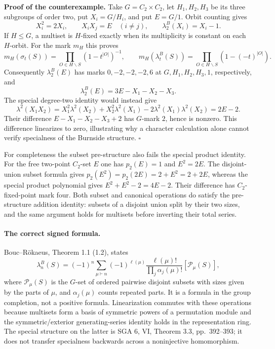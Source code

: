 \documentclass[11pt]{article}
\begin{document}
\textbf{Proof of the counterexample.}
Take $G=C_2\times C_2$, let $H_1,H_2,H_3$ be its three subgroups of order
two, put $X_i=G/H_i$, and put $E=G/1$.  Orbit counting gives
\[
 X_i^2=2X_i,\qquad X_iX_j=E\quad(i\ne j),\qquad
 \lambda_2^B(X_i)=X_i-1.
\]
If $H\leq G$, a multiset is $H$-fixed exactly when its multiplicity is
constant on each $H$-orbit.  For the mark $m_H$ this proves
\[
 m_H(\sigma_t(S))=\prod_{O\in H\backslash S}(1-t^{|O|})^{-1},\qquad
 m_H(\lambda_t^B(S))=\prod_{O\in H\backslash S}(1-(-t)^{|O|}).
\]
Consequently $\lambda_2^B(E)$ has marks $0,-2,-2,-2,6$ at
$G,H_1,H_2,H_3,1$, respectively, and
\[
 \lambda_2^B(E)=3E-X_1-X_2-X_3.
\]
The special degree-two identity would instead give
\[
 \lambda^2(X_1X_2)
 =X_1^2\lambda^2(X_2)+X_2^2\lambda^2(X_1)
       -2\lambda^2(X_1)\lambda^2(X_2)=2E-2.
\]
Their difference $E-X_1-X_2-X_3+2$ has $G$-mark $2$, hence is nonzero.
This difference linearizes to zero, illustrating why a character calculation
alone cannot verify specialness of the Burnside structure. \hfill$\square$

For completeness the subset pre-structure also fails the special
product identity. For the free two-point $C_2$-set $E$ one has
$p_2(E)=1$ and $E^2=2E$. The disjoint-union subset formula gives
$p_2(E^2)=p_2(2E)=2+E^2=2+2E$, whereas the special product
polynomial gives $E^2+E^2-2=4E-2$. Their difference has
$C_2$-fixed-point mark four. Both subset and canonical operations
do satisfy the pre-structure addition identity: subsets of a
disjoint union split by their two sizes, and the same argument
holds for multisets before inverting their total series.

\paragraph{The correct signed formula.}
Bouc--R\"okaeus, Theorem 1.1 (1.2), states
\[
 \lambda_n^B(S)=(-1)^n\sum_{\mu\vdash n}(-1)^{\ell(\mu)}
 \frac{\ell(\mu)!}{\prod_j\alpha_j(\mu)!}[\mathcal P_\mu(S)],
\]
where $\mathcal P_\mu(S)$ is the $G$-set of ordered pairwise disjoint subsets
with sizes given by the parts of $\mu$, and $\alpha_j(\mu)$ counts repeated
parts.  It is a formula in the group completion, not a positive formula.
Linearization commutes with these operations because multisets form a basis
of symmetric powers of a permutation module and the symmetric/exterior
generating-series identity holds in the representation ring.  The special
structure on the latter is SGA 6, VI, Theorem 3.3, pp.~392--393; it does not
transfer specialness backwards across a noninjective homomorphism.
\end{document}
